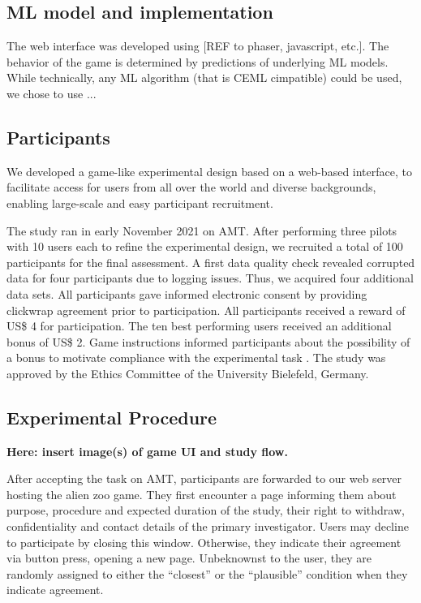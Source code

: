 \subsection{ML model and implementation}
\textcolor{ACMDarkBlue}{
The web interface was developed using [REF to phaser, javascript, etc.].
} \textcolor{ACMDarkBlue}{
The behavior of the game is determined by predictions of underlying ML models. 
} \textcolor{ACMDarkBlue}{
While technically, any ML algorithm (that is CEML cimpatible) could be used, we chose to use ...
}

\subsection{Participants}

\textcolor{ACMDarkBlue}{
We developed a game-like experimental design based on a web-based interface, to facilitate access for users from all over the world and diverse backgrounds, enabling large-scale and easy participant recruitment.
}

The study ran in early November 2021 on \gls{AMT}.
After performing three pilots with 10 users each to refine the experimental design, we recruited a total of 100 participants for the final assessment. %
A first data quality check revealed corrupted data for four participants due to logging issues. Thus, we acquired four additional data sets. 
All participants gave informed electronic consent by providing clickwrap agreement prior to participation.
All participants received a reward of US\$ 4 for participation. 
The ten best performing users received an additional bonus of US\$ 2. 
Game instructions informed participants about the possibility of a bonus to motivate compliance with the experimental task \citep{bansal_updates_2019}.
The study was approved by the Ethics Committee of the University Bielefeld, Germany.

\subsection{Experimental Procedure}\label{subsec:experimental-procedure}

\textbf{Here: insert image(s) of game UI and study flow.}

After accepting the task on \gls{AMT}, participants are forwarded to our web server hosting the alien zoo game.
They first encounter a page informing them about purpose, procedure and expected duration of the study, their right to withdraw, confidentiality and contact details of the primary investigator.
Users may decline to participate by closing this window.
Otherwise, they indicate their agreement via button press, opening a new page.
Unbeknownst to the user, they are randomly assigned to either the ``closest'' or the ``plausible'' condition when they indicate agreement.

